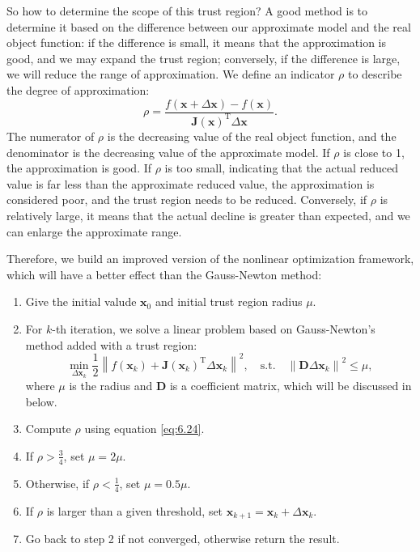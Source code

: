 So how to determine the scope of this trust region? A good method is to determine it based on the difference between our approximate model and the real object function: if the difference is small, it means that the approximation is good, and we may expand the trust region; conversely, if the difference is large, we will reduce the range of approximation. We define an indicator $\rho$ to describe the degree of approximation:
\begin{equation}\label{eq:6.24}
	\rho = \frac{{f\left( {\mathbf{x} + \Delta \mathbf{x}} \right)}-{{ {f\left( \mathbf{x} \right)} }}} {\mathbf{J}\left( \mathbf{x} \right)^\mathrm{T} \Delta \mathbf{x}}.
\end{equation}
The numerator of $\rho$ is the decreasing value of the real object function, and the denominator is the decreasing value of the approximate model. If $\rho$ is close to 1, the approximation is good. If $\rho$ is too small, indicating that the actual reduced value is far less than the approximate reduced value, the approximation is considered poor, and the trust region needs to be reduced. Conversely, if $\rho$ is relatively large, it means that the actual decline is greater than expected, and we can enlarge the approximate range.

Therefore, we build an improved version of the nonlinear optimization framework, which will have a better effect than the Gauss-Newton method:

\begin{mdframed}
	\begin{enumerate}
		\item Give the initial valude $\mathbf{x}_0$ and initial trust region radius $\mu$.
		\item For $k$-th iteration, we solve a linear problem based on Gauss-Newton's method added with a trust region: 
		\begin{equation}\label{eq:LM}
			\mathop {\min }\limits_{\Delta \mathbf{x}_k} \frac{1}{2}{\left\| {f\left( \mathbf{x}_k \right) + \mathbf{J} \left( \mathbf{x}_k \right)^\mathrm{T} \Delta \mathbf{x}_k} \right\|^2}, \quad \mathrm{s.t.}\quad {\left\| {\mathbf{D} \Delta \mathbf{x}_k} \right\|^2} \leqslant \mu ,
		\end{equation}
		where $\mu$ is the radius and $\mathbf{D}$ is a coefficient matrix, which will be discussed in below. 
		\item Compute $\rho$ using equation \eqref{eq:6.24}. 
		\item If $\rho > \frac{3}{4}$, set $\mu = 2 \mu$. 
		\item Otherwise, if $\rho < \frac{1}{4}$, set $\mu = 0.5 \mu$. 
		\item If $\rho$ is larger than a given threshold, set $\mathbf{x}_{k+1} = \mathbf{x}_k+\Delta \mathbf{x}_k$. 
		\item Go back to step 2 if not converged, otherwise return the result. 
	\end{enumerate}
\end{mdframed}

